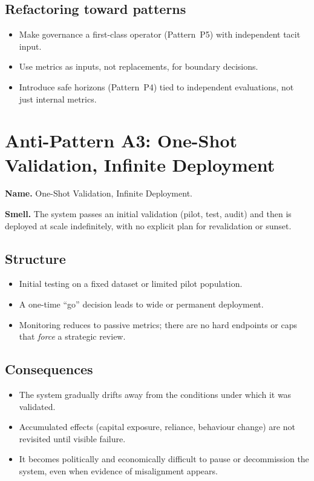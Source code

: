 \subsection*{Refactoring toward patterns}

\begin{itemize}
  \item Make governance a first-class operator (Pattern~P5) with
        independent tacit input.
  \item Use metrics as inputs, not replacements, for boundary decisions.
  \item Introduce safe horizons (Pattern~P4) tied to independent
        evaluations, not just internal metrics.
\end{itemize}

\section{Anti-Pattern A3: One-Shot Validation, Infinite Deployment}
\label{antipattern:a3}

\textbf{Name.} One-Shot Validation, Infinite Deployment.

\textbf{Smell.} The system passes an initial validation (pilot, test,
audit) and then is deployed at scale indefinitely, with no explicit
plan for revalidation or sunset.

\subsection*{Structure}

\begin{itemize}
  \item Initial testing on a fixed dataset or limited pilot population.
  \item A one-time ``go'' decision leads to wide or permanent
        deployment.
  \item Monitoring reduces to passive metrics; there are no hard
        endpoints or caps that \emph{force} a strategic review.
\end{itemize}

\subsection*{Consequences}

\begin{itemize}
  \item The system gradually drifts away from the conditions under
        which it was validated.
  \item Accumulated effects (capital exposure, reliance, behaviour
        change) are not revisited until visible failure.
  \item It becomes politically and economically difficult to pause or
        decommission the system, even when evidence of misalignment
        appears.
\end{itemize}

